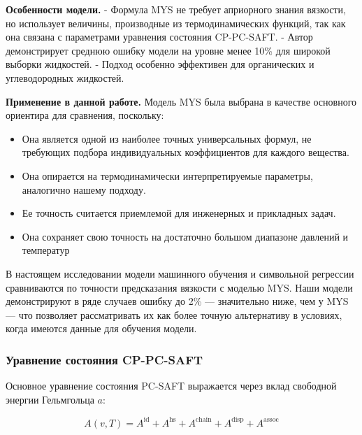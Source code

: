 \documentclass[a4paper,12pt]{article}
\begin{document}
\textbf{Особенности модели.}  
- Формула MYS не требует априорного знания вязкости, но использует величины, производные из термодинамических функций, так как она связана с параметрами уравнения состояния CP-PC-SAFT.
- Автор демонстрирует среднюю ошибку модели на уровне менее 10\% для широкой выборки жидкостей.
- Подход особенно эффективен для органических и углеводородных жидкостей.

\textbf{Применение в данной работе.}  
Модель MYS была выбрана в качестве основного ориентира для сравнения, поскольку:
\begin{itemize}
  \item Она является одной из наиболее точных универсальных формул, не требующих подбора индивидуальных коэффициентов для каждого вещества.
  \item Она опирается на термодинамически интерпретируемые параметры, аналогично нашему подходу.
  \item Ее точность считается приемлемой для инженерных и прикладных задач.
  \item Она сохраняет свою точность на достаточно большом диапазоне давлений и температур
\end{itemize}

В настоящем исследовании модели машинного обучения и символьной регрессии сравниваются по точности предсказания вязкости с моделью MYS. Наши модели демонстрируют в ряде случаев ошибку до 2\% — значительно ниже, чем у MYS — что позволяет рассматривать их как более точную альтернативу в условиях, когда имеются данные для обучения модели.

\subsubsection{Уравнение состояния CP-PC-SAFT}

Основное уравнение состояния PC-SAFT выражается через вклад свободной энергии Гельмгольца \( a \):

\begin{equation}
A(v, T) = A^{\text{id}} + A^{\text{hs}} + A^{\text{chain}} + A^{\text{disp}} + A^{\text{assoc}}
\end{equation}
\end{document}
